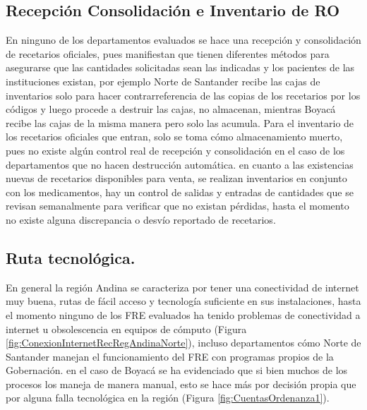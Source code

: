 \documentclass[
]{book}
\begin{document}
\hypertarget{recepciuxf3n-consolidaciuxf3n-e-inventario-de-ro}{%
\subsection{Recepción Consolidación e Inventario de RO}\label{recepciuxf3n-consolidaciuxf3n-e-inventario-de-ro}}

En ninguno de los departamentos evaluados se hace una recepción y consolidación de recetarios oficiales, pues manifiestan que tienen diferentes métodos para asegurarse que las cantidades solicitadas sean las indicadas y los pacientes de las instituciones existan, por ejemplo Norte de Santander recibe las cajas de inventarios solo para hacer contrarreferencia de las copias de los recetarios por los códigos y luego procede a destruir las cajas, no almacenan, mientras Boyacá recibe las cajas de la misma manera pero solo las acumula. Para el inventario de los recetarios oficiales que entran, solo se toma cómo almacenamiento muerto, pues no existe algún control real de recepción y consolidación en el caso de los departamentos que no hacen destrucción automática. en cuanto a las existencias nuevas de recetarios disponibles para venta, se realizan inventarios en conjunto con los medicamentos, hay un control de salidas y entradas de cantidades que se revisan semanalmente para verificar que no existan pérdidas, hasta el momento no existe alguna discrepancia o desvío reportado de recetarios.

\hypertarget{ruta-tecnoluxf3gica.}{%
\subsection{Ruta tecnológica.}\label{ruta-tecnoluxf3gica.}}

En general la región Andina se caracteriza por tener una conectividad de internet muy buena, rutas de fácil acceso y tecnología suficiente en sus instalaciones, hasta el momento ninguno de los FRE evaluados ha tenido problemas de conectividad a internet u obsolescencia en equipos de cómputo (Figura \ref{fig:ConexionInternetRecRegAndinaNorte}), incluso departamentos cómo Norte de Santander manejan el funcionamiento del FRE con programas propios de la Gobernación. en el caso de Boyacá se ha evidenciado que si bien muchos de los procesos los maneja de manera manual, esto se hace más por decisión propia que por alguna falla tecnológica en la región (Figura \ref{fig:CuentasOrdenanza1}).
\end{document}
